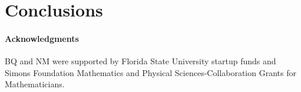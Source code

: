 \documentclass[preprint, 10pt]{elsarticle}
\begin{document}

\section{Conclusions}
\label{sec:conclusions}


\paragraph{\bf Acknowledgments} BQ and NM were supported by Florida
State University startup funds and Simons Foundation Mathematics and
Physical Sciences-Collaboration Grants for Mathematicians.

 

\end{document}
